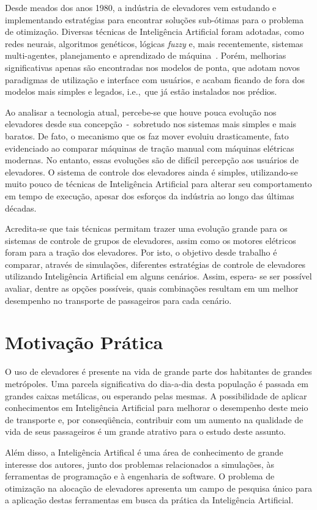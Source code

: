 Desde meados dos anos 1980, a indústria de elevadores vem estudando e
implementando estratégias para encontrar soluções sub-ótimas para o problema de
otimização. Diversas técnicas de Inteligência Artificial foram adotadas, como
redes neurais, algoritmos genéticos, lógicas \textit{fuzzy} e, mais
recentemente, sistemas multi-agentes, planejamento e aprendizado de
máquina~\cite{KOEHLEROTTIGER02}. Porém, melhorias significativas apenas são
encontradas nos modelos de ponta, que adotam novos paradigmas de utilização e
interface com usuários, e acabam ficando de fora dos modelos mais simples e
legados, i.e.,~que já estão instalados nos prédios.

Ao analisar a tecnologia atual, percebe-se que houve pouca evolução nos
elevadores desde sua concepção~-~sobretudo nos sistemas mais simples e mais
baratos. De fato, o mecanismo que os faz mover evoluiu drasticamente, fato
evidenciado ao comparar máquinas de tração manual com máquinas elétricas
modernas. No entanto, essas evoluções são de difícil percepção aos usuários de
elevadores. O sistema de controle dos elevadores ainda é simples, utilizando-se
muito pouco de técnicas de Inteligência Artificial para alterar seu
comportamento em tempo de execução, apesar dos esforços da indústria ao longo
das últimas décadas.

Acredita-se que tais técnicas permitam trazer uma evolução grande para os
sistemas de controle de grupos de elevadores, assim como os motores elétricos
foram para a tração dos elevadores. Por isto, o objetivo desde trabalho é
comparar, através de simulações, diferentes estratégias de controle de
elevadores utilizando Inteligência Artificial em alguns cenários. Assim, espera-
se ser possível avaliar, dentre as opções possíveis, quais combinações resultam
em um melhor desempenho no transporte de passageiros para cada cenário.

\section{Motivação Prática}

O uso de elevadores é presente na vida de grande parte dos habitantes de grandes
metrópoles. Uma parcela significativa do dia-a-dia desta população é passada em
grandes caixas metálicas, ou esperando pelas mesmas. A possibilidade de aplicar
conhecimentos em Inteligência Artificial para melhorar o desempenho deste meio
de transporte e, por conseqüência, contribuir com um aumento na qualidade de
vida de seus passageiros é um grande atrativo para o estudo deste assunto.

Além disso, a Inteligência Artifical é uma área de conhecimento de grande
interesse dos autores, junto dos problemas relacionados a simulações, às
ferramentas de programação e à engenharia de software. O problema de otimização
na alocação de elevadores apresenta um campo de pesquisa único para a aplicação
destas ferramentas em busca da prática da Inteligência Artificial.

